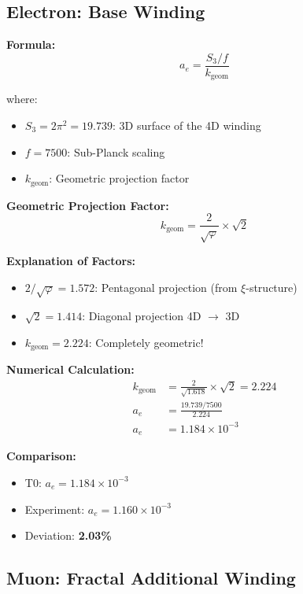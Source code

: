 	\subsection{Electron: Base Winding}
	
	\textbf{Formula:}
	\begin{equation}
		a_e = \frac{S_3/f}{k_{\text{geom}}}
		\label{eq:ae}
	\end{equation}
	
	where:
	\begin{itemize}
		\item $S_3 = 2\pi^2 = 19.739$: 3D surface of the 4D winding
		\item $f = 7500$: Sub-Planck scaling
		\item $k_{\text{geom}}$: Geometric projection factor
	\end{itemize}
	
	\textbf{Geometric Projection Factor:}
	\begin{equation}
		k_{\text{geom}} = \frac{2}{\sqrt{\varphi}} \times \sqrt{2}
		\label{eq:kgeom}
	\end{equation}
	
	\textbf{Explanation of Factors:}
	\begin{itemize}
		\item $2/\sqrt{\varphi} = 1.572$: Pentagonal projection (from $\xi$-structure)
		\item $\sqrt{2} = 1.414$: Diagonal projection 4D $\to$ 3D
		\item $k_{\text{geom}} = 2.224$: Completely geometric!
	\end{itemize}
	
	\textbf{Numerical Calculation:}
	\begin{align}
		k_{\text{geom}} &= \frac{2}{\sqrt{1.618}} \times \sqrt{2} = 2.224 \\
		a_e &= \frac{19.739 / 7500}{2.224} \\
		a_e &= 1.184 \times 10^{-3}
	\end{align}
	
	\textbf{Comparison:}
	\begin{itemize}
		\item T0: $a_e = 1.184 \times 10^{-3}$
		\item Experiment: $a_e = 1.160 \times 10^{-3}$
		\item Deviation: \textbf{2.03\%}
	\end{itemize}
	
	\subsection{Muon: Fractal Additional Winding}
	
